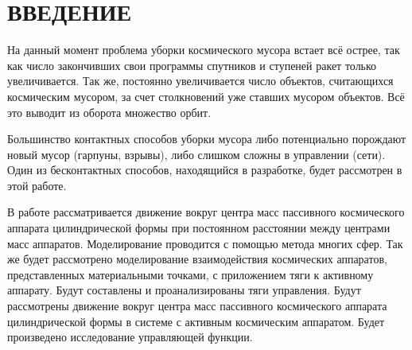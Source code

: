 \section*{ВВЕДЕНИЕ}

На данный момент проблема уборки космического мусора встает всё острее, так как число закончивших свои программы спутников и ступеней ракет только увеличивается.
Так же, постоянно увеличивается число объектов, считающихся космическим мусором, за счет столкновений уже ставших мусором объектов.
Всё это выводит из оборота множество орбит.

Большинство контактных способов уборки мусора либо потенциально порождают новый мусор (гарпуны, взрывы), либо слишком сложны в управлении (сети).
Один из бесконтактных способов, находящийся в разработке, будет рассмотрен в этой работе.

В работе рассматривается движение вокруг центра масс пассивного космического аппарата цилиндрической формы при постоянном расстоянии между центрами масс аппаратов. Моделирование проводится с помощью метода многих сфер.
Так же будет рассмотрено моделирование взаимодействия космических аппаратов, представленных материальными точками, с приложением тяги к активному аппарату. 
Будут составлены и проанализированы тяги управления.
Будут рассмотрены движение вокруг центра масс пассивного космического аппарата цилиндрической формы в системе с активным космическим аппаратом. Будет произведено исследование управляющей функции.